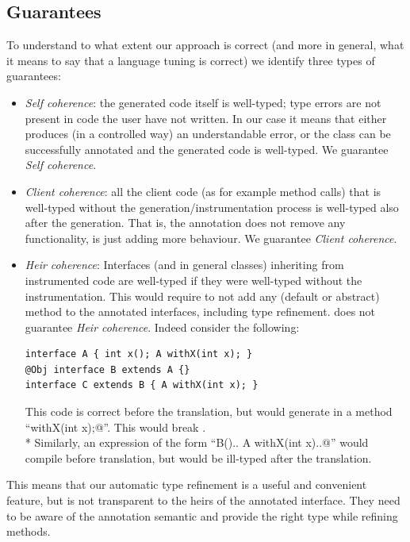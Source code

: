


\subsection{Guarantees}
To understand to what extent our approach is correct (and more in general, what it means to say that a language tuning is correct) we identify three types of guarantees:
\begin{itemize}
\item \textit{Self coherence}: the generated code itself is well-typed; type errors are not present in code the user have not written.
In our case it means that either \mixin{} produces (in a controlled way) an understandable error, or the class can be successfully annotated and the generated code is well-typed.
We guarantee \textit{Self coherence}.

\item \textit{Client coherence}: all the client code (as for example method calls) that is well-typed without the generation/instrumentation process is well-typed also after the generation.
That is, the annotation does not remove any functionality, is just
adding more behaviour.
We guarantee \textit{Client coherence}.

\item \textit{Heir coherence}: Interfaces (and in general classes) inheriting from instrumented code are well-typed if they were well-typed without the instrumentation.
This would require to not add any (default or abstract) method to the annotated interfaces, including type refinement.
\mixin  does not guarantee \textit{Heir coherence}.
Indeed consider the following:

\begin{lstlisting}
interface A { int x(); A withX(int x); }
@Obj interface B extends A {}
interface C extends B { A withX(int x); }
\end{lstlisting}

\noindent This code is correct before the translation, but \mixin would  generate in \Q@B@  a method ``\Q@B withX(int x);@''.
This would break \Q@C@. \\*
Similarly, an expression of the form ``\Q@new B(){.. A withX(int x){..}}@'' would compile before translation, but would be ill-typed after the translation.
\end{itemize}

\noindent This means that our automatic type refinement
is a useful and convenient feature, but is not transparent to the heirs of the annotated interface. They need to be aware of the annotation semantic  and provide the right type while refining methods.

